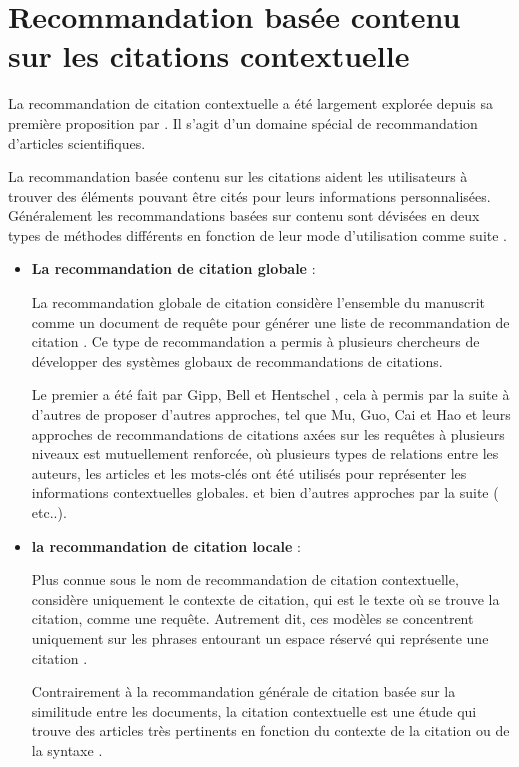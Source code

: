	
\section{Recommandation basée contenu sur les citations contextuelle}
\par La recommandation de citation contextuelle a été largement explorée depuis sa première proposition par \cite{ch1ref18}. Il s'agit d'un domaine spécial de recommandation d'articles scientifiques.

\par La recommandation basée contenu sur les citations aident les utilisateurs à trouver des éléments pouvant être cités pour leurs informations personnalisées. Généralement les recommandations basées sur contenu sont dévisées en deux types de méthodes différents en fonction de leur mode d'utilisation comme suite \cite{ch1ref9}.

\begin{itemize}
\setlength{\itemsep}{5pt}
	\item \textbf{La recommandation de citation globale} :
	\par La recommandation globale de citation considère l'ensemble du manuscrit comme un document de requête pour générer une liste de recommandation de citation \cite{ch1ref9}. Ce type de recommandation a permis à plusieurs chercheurs de développer des systèmes globaux de recommandations de citations. 
	\par Le premier a été fait par Gipp, Bell et Hentschel \cite{ch1ref10}, cela à permis par la suite à d'autres de proposer d'autres approches, tel que Mu, Guo, Cai et Hao \cite{ch1ref11} et leurs approches de recommandations de citations axées sur les requêtes à plusieurs niveaux est mutuellement renforcée, où plusieurs types de relations entre les auteurs, les articles et les mots-clés ont été utilisés pour représenter les informations contextuelles globales. et bien d'autres approches par la suite (\cite{ch1ref12,ch1ref13,ch1ref14} etc..). 
	
	\item \textbf{la recommandation de citation locale} : 
	\par Plus connue sous le nom de recommandation de citation contextuelle, considère uniquement le contexte de citation, qui est le texte où se trouve la citation, comme une requête. Autrement dit, ces modèles se concentrent uniquement sur les phrases entourant un espace réservé qui représente une citation \cite{ch1ref9}.
	
	Contrairement à la recommandation générale de citation basée sur la similitude entre les documents, la citation contextuelle est une étude qui trouve des articles très pertinents en fonction du contexte de la citation ou de la syntaxe \cite{ch1ref8}.
	
\end{itemize}

